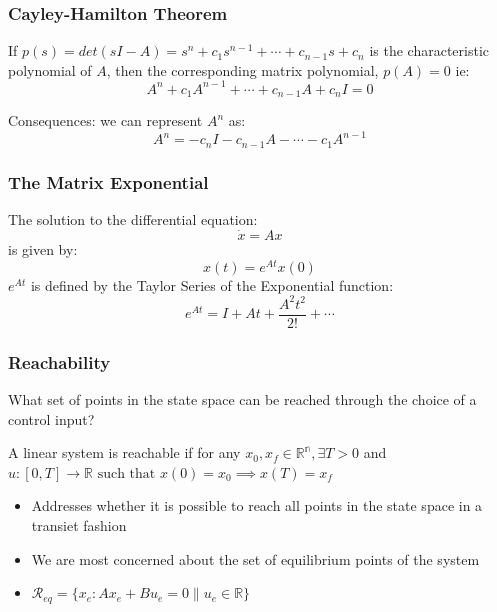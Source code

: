 \documentclass{beamer}
\theoremstyle{remark}
\begin{document}
\begin{frame}
\frametitle{Cayley-Hamilton Theorem}
If $p(s) = det(sI - A) = s^n + c_1 s^{n-1} + \cdots + c_{n-1} s + c_n$ is the characteristic polynomial 
of $A$, then the corresponding matrix polynomial, $p(A) = 0$ ie:
\begin{equation}
    A^n + c_1 A^{n-1} + \cdots + c_{n-1} A + c_n I = 0
\end{equation}

Consequences: we can represent $A^n$ as:
\begin{equation}
    A^n = -c_n I - c_{n-1} A - \cdots - c_1 A^{n-1}
\end{equation}
\end{frame}

\begin{frame}
\frametitle{The Matrix Exponential}
The solution to the differential equation: 
\begin{equation}
    \dot{x} = Ax
\end{equation}
is given by: 
\begin{equation}
    x(t) = e^{At}x(0)
\end{equation}
$e^{At}$ is defined by the Taylor Series of the Exponential function:
\begin{equation}
    e^{At} = I + At + \frac{A^2t^2}{2!} + \cdots
\end{equation}
\end{frame}

\begin{frame}
\frametitle{Reachability}
What set of points in the state space can be reached through the choice of a control input?
\begin{definition}[Reachability]
A linear system is reachable if for any $x_0, x_f \in \mathbb{R^n}, \exists T>0$ and $u: [0,T] \to \mathbb{R} \text{ such that } x(0) = x_0 \implies x(T) = x_f$
\end{definition}

\begin{itemize}
    \item Addresses whether it is possible to reach all points in the state space in a transiet fashion
    \item We are most concerned about the set of equilibrium points of the system
    \item $\mathcal{R}_{eq}= \{x_e: Ax_e + Bu_e = 0 \| u_e \in \mathbb{R}\}$
\end{itemize}
\end{frame}
\end{document}

